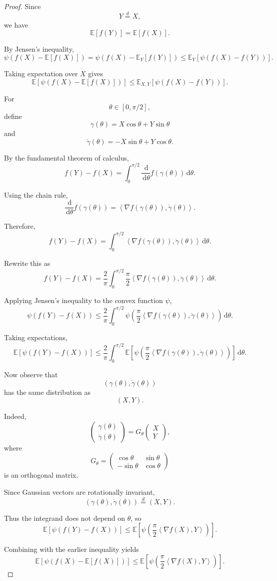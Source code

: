 \documentclass[12pt,oneside]{book}
\numberwithin{equation}{section}
\theoremstyle{definition}
\theoremstyle{plain}
\theoremstyle{remark}
\newcommand{\E}{\mathbb{E}}
\newcommand{\inner}[2]{\left\langle #1, #2 \right\rangle}
\newcommand{\dd}{\,\mathrm{d}}
\newcommand{\grad}{\nabla}
\begin{document}
\begin{proof}
Since
\[
Y\stackrel{d}{=}X,
\]
we have
\[
\E[f(Y)]
=
\E[f(X)].
\]

By Jensen's inequality,
\[
\psi(f(X)-\E[f(X)])
=
\psi\left(
f(X)-\E_Y[f(Y)]
\right)
\leq
\E_Y[\psi(f(X)-f(Y))].
\]

Taking expectation over $X$ gives
\[
\E[\psi(f(X)-\E[f(X)])]
\leq
\E_{X,Y}[\psi(f(X)-f(Y))].
\]

For
\[
\theta\in[0,\pi/2],
\]
define
\[
\gamma(\theta)
=
X\cos\theta+Y\sin\theta
\]
and
\[
\dot{\gamma}(\theta)
=
-X\sin\theta+Y\cos\theta.
\]

By the fundamental theorem of calculus,
\[
f(Y)-f(X)
=
\int_0^{\pi/2}
\frac{\dd}{\dd\theta}
f(\gamma(\theta))
\dd\theta.
\]

Using the chain rule,
\[
\frac{\dd}{\dd\theta}
f(\gamma(\theta))
=
\inner{
\grad f(\gamma(\theta))
}{
\dot{\gamma}(\theta)
}.
\]

Therefore,
\[
f(Y)-f(X)
=
\int_0^{\pi/2}
\inner{
\grad f(\gamma(\theta))
}{
\dot{\gamma}(\theta)
}
\dd\theta.
\]

Rewrite this as
\[
f(Y)-f(X)
=
\frac{2}{\pi}
\int_0^{\pi/2}
\frac{\pi}{2}
\inner{
\grad f(\gamma(\theta))
}{
\dot{\gamma}(\theta)
}
\dd\theta.
\]

Applying Jensen's inequality to the convex function $\psi$,
\[
\psi(f(Y)-f(X))
\leq
\frac{2}{\pi}
\int_0^{\pi/2}
\psi\left(
\frac{\pi}{2}
\inner{
\grad f(\gamma(\theta))
}{
\dot{\gamma}(\theta)
}
\right)
\dd\theta.
\]

Taking expectations,
\[
\E[\psi(f(Y)-f(X))]
\leq
\frac{2}{\pi}
\int_0^{\pi/2}
\E\left[
\psi\left(
\frac{\pi}{2}
\inner{
\grad f(\gamma(\theta))
}{
\dot{\gamma}(\theta)
}
\right)
\right]
\dd\theta.
\]

Now observe that
\[
(\gamma(\theta),\dot{\gamma}(\theta))
\]
has the same distribution as
\[
(X,Y).
\]

Indeed,
\[
\begin{pmatrix}
\gamma(\theta)
\\
\dot{\gamma}(\theta)
\end{pmatrix}
=
G_\theta
\begin{pmatrix}
X
\\
Y
\end{pmatrix},
\]
where
\[
G_\theta
=
\begin{pmatrix}
\cos\theta & \sin\theta
\\
-\sin\theta & \cos\theta
\end{pmatrix}
\]
is an orthogonal matrix.

Since Gaussian vectors are rotationally invariant,
\[
(\gamma(\theta),\dot{\gamma}(\theta))
\stackrel{d}{=}
(X,Y).
\]

Thus the integrand does not depend on $\theta$, so
\[
\E[\psi(f(Y)-f(X))]
\leq
\E\left[
\psi\left(
\frac{\pi}{2}
\inner{
\grad f(X)
}{Y}
\right)
\right].
\]

Combining with the earlier inequality yields
\[
\E[\psi(f(X)-\E[f(X)])]
\leq
\E\left[
\psi\left(
\frac{\pi}{2}
\inner{
\grad f(X)
}{Y}
\right)
\right].
\]
\end{proof}
\end{document}
